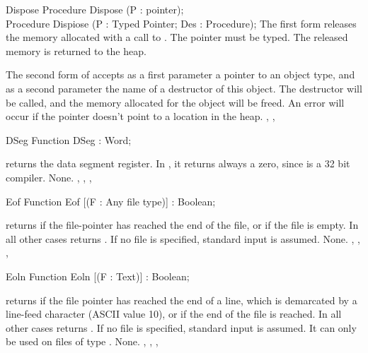 \documentclass{report}
\begin{document}

\begin{procedure}{Dispose}
\Declaration
Procedure Dispose (P : pointer);\\
Procedure Dispiose (P : Typed Pointer; Des : Procedure);
\Description
The first form  releases the memory allocated with a call to 
. The pointer  must be typed. The released memory is 
returned to the heap.

The second form of  accepts as a first parameter a pointer 
to an object type, and as a second parameter the name of a destructor
of this object. The destructor will be called, and the memory allocated 
for the object will be freed.
\Errors
An error will occur if the pointer doesn't point to a location in the
heap.
\SeeAlso
{}, , 
\end{procedure}


\begin{function}{DSeg}
\Declaration
Function DSeg  : Word;

\Description
{} returns the data segment register. In \fpc, it returns always a
zero, since \fpc is a 32 bit compiler.
\Errors
None.
\SeeAlso
{}, , , 
\end{function}


\begin{function}{Eof}
\Declaration
Function Eof [(F : Any file type)] : Boolean;

\Description
{} returns  if the file-pointer has reached the end of the
file, or if the file is empty. In all other cases  returns
.
If no file  is specified, standard input is assumed.
\Errors
None.
\SeeAlso
{}, , , 
\end{function}


\begin{function}{Eoln}
\Declaration
Function Eoln [(F : Text)] : Boolean;

\Description
{} returns  if the file pointer has reached the end of a
line, which is demarcated by a line-feed character (ASCII value 10), or if
the end of the file is reached.
In all other cases  returns .
If no file  is specified, standard input is assumed.
It can only be used on files of type .
\Errors
None.
\SeeAlso
{}, , , 
\end{function}
\end{document}
